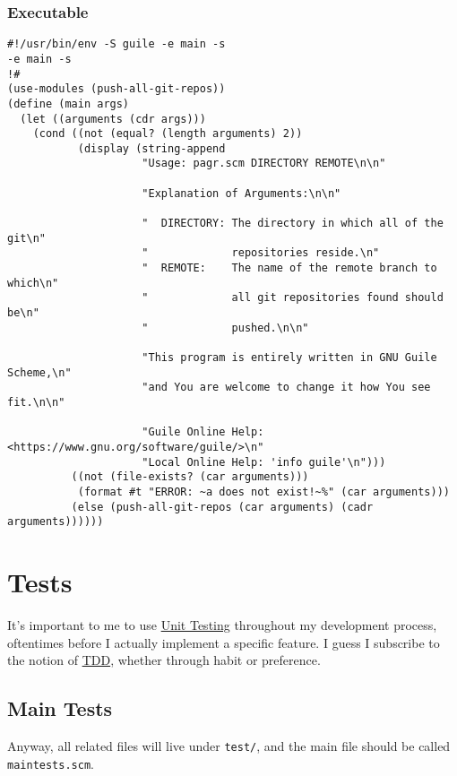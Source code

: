 \documentclass[11pt]{article}
\begin{document}
\subsubsection{Executable}
\label{sec:org611f7a0}
\begin{verbatim}
#!/usr/bin/env -S guile -e main -s
-e main -s
!#
(use-modules (push-all-git-repos))
(define (main args)
  (let ((arguments (cdr args)))
    (cond ((not (equal? (length arguments) 2))
           (display (string-append
                     "Usage: pagr.scm DIRECTORY REMOTE\n\n"

                     "Explanation of Arguments:\n\n"

                     "  DIRECTORY: The directory in which all of the git\n"
                     "             repositories reside.\n"
                     "  REMOTE:    The name of the remote branch to which\n"
                     "             all git repositories found should be\n"
                     "             pushed.\n\n"

                     "This program is entirely written in GNU Guile Scheme,\n"
                     "and You are welcome to change it how You see fit.\n\n"

                     "Guile Online Help: <https://www.gnu.org/software/guile/>\n"
                     "Local Online Help: 'info guile'\n")))
          ((not (file-exists? (car arguments)))
           (format #t "ERROR: ~a does not exist!~%" (car arguments)))
          (else (push-all-git-repos (car arguments) (cadr arguments))))))

\end{verbatim}

\section{Tests}
\label{sec:org302f2ac}
It's important to me to use \href{https://en.wikipedia.org/wiki/Unit\_testing}{Unit Testing} throughout my development process,
oftentimes before I actually implement a specific feature. I guess I subscribe
to the notion of \href{https://en.wikipedia.org/wiki/Test-driven\_development}{TDD}, whether through habit or preference.

\subsection{Main Tests}
\label{sec:orge23ab6d}
Anyway, all related files will live under \texttt{test/}, and the main file should be
called \texttt{maintests.scm}.
\end{document}
